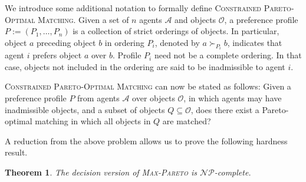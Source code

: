 \documentclass[a4paper, 11pt]{article}
\newtheorem{thm}{Theorem}
\newcommand{\mc}{\mathcal}
\begin{document}
We introduce some additional notation to formally define \textsc{Constrained Pareto-Optimal Matching}. Given a set of $n$ agents $\mc{A}$ and objects $\mc{O}$, a preference profile $P := (P_1, \dots, P_n)$ is a collection of strict orderings of objects. In particular, object $a$ preceding object $b$ in ordering $P_i$, denoted by $a \succ_{P_i} b$, indicates that agent $i$ prefers object $a$ over $b$. Profile $P_i$ need not be a complete ordering. In that case, objects not included in the ordering are said to be inadmissible to agent $i$. 

\textsc{Constrained Pareto-Optimal Matching} can now be stated as follows: Given a preference profile $P$ from agents $\mc{A}$ over objects $\mc{O}$, in which agents may have inadmissible objects, and a subset of objects $Q \subseteq \mc{O}$, does there exist a Pareto-optimal matching in which all objects in $Q$ are matched?

A reduction from the above problem allows us to prove the following hardness result.
\begin{thm}
The decision version of \textsc{Max-Pareto} is $\mc{NP}$-complete.
\end{thm}
\end{document}
